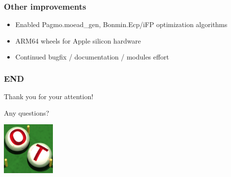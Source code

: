 \documentclass[aspectratio=169]{beamer}
\begin{document}


\begin{frame}
\frametitle{Other improvements}

\begin{itemize}
\item Enabled Pagmo.moead_gen, Bonmin.Ecp/iFP optimization algorithms
\item ARM64 wheels for Apple silicon hardware
\item Continued bugfix / documentation / modules effort
\end{itemize}

\end{frame}


\begin{frame}
\frametitle{END}

Thank you for your attention!

Any questions?

\begin{center}
\includegraphics[width=0.2\textwidth]{figures/logo-ot-small}
\end{center}

\end{frame}

% 
% 
% 
% 
\end{document}

